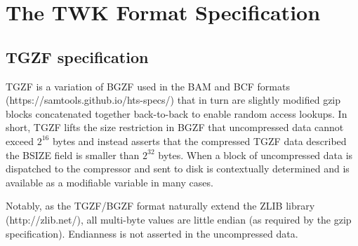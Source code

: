 \documentclass[10pt]{article}
\begin{document}
\section{The TWK Format Specification}

\subsection{TGZF specification}
TGZF is a variation of BGZF used in the BAM and BCF formats (https://samtools.github.io/hts-specs/) that in turn are slightly modified gzip blocks concatenated together back-to-back to enable random access lookups. In short, TGZF lifts the size restriction in BGZF that uncompressed data cannot exceed $2^{16}$  bytes and instead asserts that the compressed TGZF data described the BSIZE field is smaller than $2^{32}$ bytes. When a block of uncompressed data is dispatched to the compressor and sent to disk is contextually determined and is available as a modifiable variable in many cases.

Notably, as the TGZF/BGZF format naturally extend the ZLIB library (http://zlib.net/), all multi-byte values are little endian (as required by the gzip specification). Endianness is not asserted in the uncompressed data.
\end{document}
